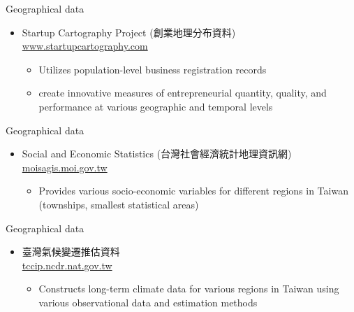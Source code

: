 \documentclass[hyperref={pdfpagelabels=false}]{beamer}
\begin{document}
\begin{frame}{Geographical data}
	\begin{itemize} 
		\item Startup Cartography Project (創業地理分布資料)
		\\ \href{https://www.startupcartography.com/home}{www.startupcartography.com}  
		\vspace{0.2cm}
		\begin{itemize} 
			\vspace{0.2cm}
			\item Utilizes population-level business registration records
						\vspace{0.2cm}
				 \item create innovative measures of entrepreneurial quantity, quality, and performance at various geographic and temporal levels
		\end{itemize}
		
		
	\end{itemize}
\end{frame}





\begin{frame}{Geographical data}
	\begin{itemize} 
		\item Social and Economic Statistics (台灣社會經濟統計地理資訊網)
		\\ \href{https://moisagis.moi.gov.tw/moiap/gis2010/index.cfm}{moisagis.moi.gov.tw}  
		\vspace{0.2cm}
		\begin{itemize} 
			\vspace{0.2cm}
            \item Provides various socio-economic variables for different regions in Taiwan (townships, smallest statistical areas)

		
		\end{itemize}
		
		
	\end{itemize}
\end{frame}



\begin{frame}{Geographical data}
	\begin{itemize} 
		\item 臺灣氣候變遷推估資料 
		\\ \href{https://tccip.ncdr.nat.gov.tw/ds_intro.aspx}{tccip.ncdr.nat.gov.tw}  
		\vspace{0.2cm}
		\begin{itemize} 
			\vspace{0.2cm}
            \item Constructs long-term climate data for various regions in Taiwan using various observational data and estimation methods

			
		\end{itemize}
		
		
	\end{itemize}
\end{frame}
\end{document}
